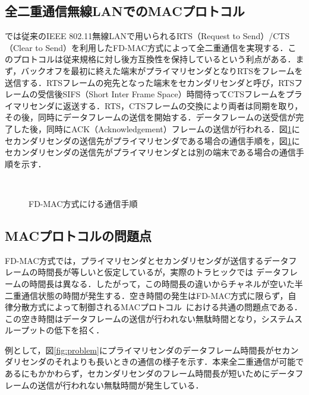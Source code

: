 \documentclass[technicalreport]{ieicej}
\begin{document}
	\subsection{全二重通信無線LANでのMACプロトコル}
	\cite{fdmac}では従来のIEEE 802.11無線LANで用いられるRTS（Request to Send）/CTS（Clear to Send）を利用したFD-MAC方式によって全二重通信を実現する．このプロトコルは従来規格に対し後方互換性を保持しているという利点がある．まず，バックオフを最初に終えた端末がプライマリセンダとなりRTSをフレームを送信する．RTSフレームの宛先となった端末をセカンダリセンダと呼び，RTSフレームの受信後SIFS（Short Inter Frame Space）時間待ってCTSフレームをプライマリセンダに返送する．RTS，CTSフレームの交換により両者は同期を取り，その後，同時にデータフレームの送信を開始する．データフレームの送受信が完了した後，同時にACK（Acknowledgement）フレームの送信が行われる．図\ref{fig:fdmac}にセカンダリセンダの送信先がプライマリセンダである場合の通信手順を，図\ref{fig:fdmac}にセカンダリセンダの送信先がプライマリセンダとは別の端末である場合の通信手順を示す．
	\begin{figure}[t]
		\centering
		\\
		\caption{FD-MAC方式にける通信手順}
		\label{fig:fdmac}
	\end{figure}

	\subsection{MACプロトコルの問題点\label{sec:problem}}
	FD-MAC方式では，プライマリセンダとセカンダリセンダが送信するデータフレームの時間長が等しいと仮定しているが，実際のトラヒックでは
	データフレームの時間長は異なる．したがって，この時間長の違いからチャネルが空いた半二重通信状態の時間が発生する．空き時間の発生はFD-MAC方式に限らず，自律分散方式によって制御されるMACプロトコル~\cite{goyal, contra}における共通の問題点である．この空き時間はデータフレームの送信が行われない無駄時間となり，システムスループットの低下を招く．
	\par
	例として，図\ref{fig:problem}にプライマリセンダのデータフレーム時間長がセカンダリセンダのそれよりも長いときの通信の様子を示す．本来全二重通信が可能であるにもかかわらず，セカンダリセンダのフレーム時間長が短いためにデータフレームの送信が行われない無駄時間が発生している．
\end{document}
